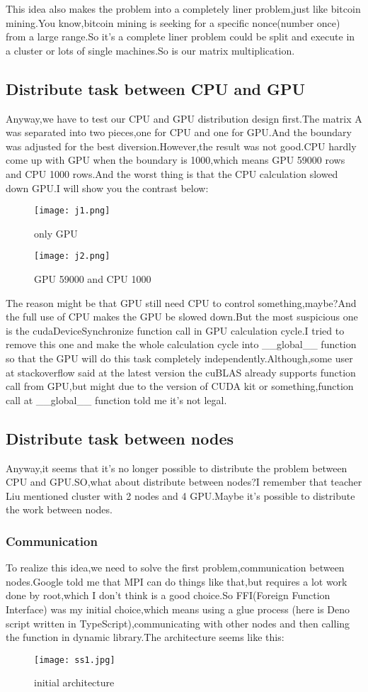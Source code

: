 \documentclass[12pt]{scrartcl} %
\begin{document}
This idea also makes the problem into a completely liner problem,just like bitcoin mining.You know,bitcoin mining is seeking for a specific nonce(number once) from a large range.So it's a complete liner problem could be split and execute in a cluster or lots of single machines.So is our matrix multiplication.
\subsection{Distribute task between CPU and GPU}
Anyway,we have to test our CPU and GPU distribution design first.The matrix A was separated into two pieces,one for CPU and one for GPU.And the boundary was adjusted for the best diversion.However,the result was not good.CPU hardly come up with GPU when the boundary is 1000,which means GPU 59000 rows and CPU 1000 rows.And the worst thing is that the CPU calculation slowed down GPU.I will show you the contrast below:
\begin{figure}[H]
    \centering
    \texttt{[image: j1.png]}
    \caption{only GPU}
    \label{}
\end{figure}
\begin{figure}[H]
    \centering
    \texttt{[image: j2.png]}
    \caption{GPU 59000 and CPU 1000}
    \label{}
\end{figure}

The reason might be that GPU still need CPU to control something,maybe?And the full use of CPU makes the GPU be slowed down.But the most suspicious one is the cudaDeviceSynchronize function call in GPU calculation cycle.I tried to remove this one and make the whole calculation cycle into \_\_global\_\_ function so that the GPU will do this task completely independently.Although,some user at stackoverflow said at the latest version the cuBLAS already supports function call from GPU,but might due to the version of CUDA kit or something,function call at \_\_global\_\_ function told me it's not legal.
\subsection{Distribute task between nodes}
Anyway,it seems that it's no longer possible to distribute the problem between CPU and GPU.SO,what about distribute between nodes?I remember that teacher Liu mentioned cluster with 2 nodes and 4 GPU.Maybe it's possible to distribute the work between nodes.
\subsubsection{Communication}
To realize this idea,we need to solve the first problem,communication between nodes.Google told me that MPI can do things like that,but requires a lot work done by root,which I don't think is a good choice.So FFI(Foreign Function Interface) was my initial choice,which means using a glue process (here is Deno script written in TypeScript),communicating with other nodes and then calling the function in dynamic library.The architecture seems like this:
\begin{figure}[H]
    \centering
    \texttt{[image: ss1.jpg]}
    \caption{initial architecture}
    \label{}
\end{figure}
\end{document}
